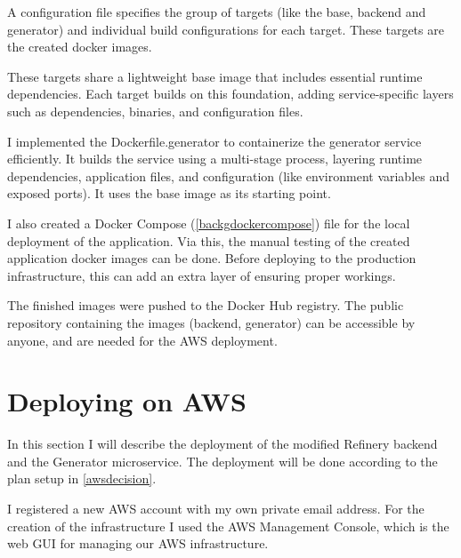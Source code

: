 			A configuration file specifies the group of targets (like the base, backend and generator) and individual build configurations for each target. 
			These targets are the created docker images.

			These targets share a lightweight base image that includes essential runtime dependencies. 
			Each target builds on this foundation, adding service-specific layers such as dependencies, binaries, and configuration files.

			I implemented the Dockerfile.generator to containerize the generator service efficiently. It builds the service using a multi-stage process, 
			layering runtime dependencies, application files, and configuration (like environment variables and exposed ports). 
			It uses the base image as its starting point.

			I also created a Docker Compose (\ref{backgdockercompose}) file for the local deployment of the application. Via this, the manual testing of the 
			created application docker images can be done. Before deploying to the production infrastructure, this can add an extra layer of ensuring proper workings.

			The finished images were pushed to the Docker Hub registry. The public repository containing the images (backend,
			generator) can be accessible by anyone, and are needed for the AWS deployment.


	\section{Deploying on AWS} \label{awsdeploy}
		In this section I will describe the deployment of the modified Refinery backend and the Generator microservice. The deployment will be 
		done according to the plan setup in \ref{awsdecision}.

		I registered a new AWS account with my own private email address.
		For the creation of the infrastructure I used the AWS Management Console, which is the web GUI for 
		managing our AWS infrastructure.

